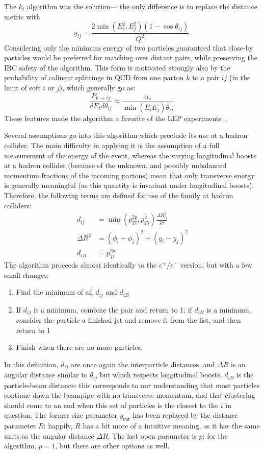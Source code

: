 The $k_t$ algorithm was the solution--- the only difference is to replace the distance metric with
%
\begin{equation}
y_{ij} = \frac{2 \min(E_i^2,E_j^2) (1-\cos{\theta_{ij}})}{Q^2}.
\end{equation}
%
Considering only the minimum energy of two particles guaranteed that close-by particles would be preferred for matching over distant pairs, while preserving the IRC safety of the algorithm. This form is motivated strongly also by the probability of colinear splittings in QCD from one parton $k$ to a pair $ij$ (in the limit of soft $i$ or $j$), which generally go as:
%
\begin{equation}
\frac{P_{k\rightarrow ij}}{dE_i d\theta_{ij}} \approx \frac{\alpha_s}{\min(E_i E_j) \theta_{ij}}.
\end{equation}
%
These features made the \kt algorithm a favorite of the LEP experiments~\cite{Jetography}.

Several assumptions go into this algorithm which preclude its use at a hadron collider. The main difficulty in applying it is the assumption of a full measurement of the energy of the event, whereas the varying longitudinal boosts at a hadron collider (because of the unknown, and possibly unbalanced momentum fractions of the incoming partons) mean that only transverse energy is generally meaningful (as this quantity is invariant under longitudinal boosts). Therefore, the following terms are defined for use of the \kt family at hadron colliders:
%
\begin{align}
d_{ij} &= \min(p_{Ti}^{2p}, p_{Tj}^{2}) \frac{\Delta R_{ij}^2}{R^2} \nonumber\\
\Delta R^2 &= (\phi_i - \phi_j)^2 + (y_i - y_j)^2\nonumber\\
d_{iB} &= p_{Ti}^{2p}
\end{align}
%
The algorithm proceeds almost identically to the $e^+/e^-$ version, but with a few small changes:
%
\begin{enumerate}
\item Find the minimum of all $d_{ij}$ and $d_{iB}$
\item If $d_{ij}$ is a minimum, combine the pair and return to 1; if $d_{iB}$ is a minimum, consider the particle a finished jet and remove it from the list, and then return to 1
\item Finish when there are no more particles.
\end{enumerate}
%
In this definition, $d_{ij}$ are once again the interparticle distances, and $\Delta R$ is an angular distance similar to $\theta_{ij}$ but which respects longitudinal boosts. $d_{iB}$ is the particle-beam distance: this corresponds to our understanding that most particles continue down the beampipe with no transverse momentum, and that clustering should come to an end when this set of particles is the closest to the $i$ in question. The former size parameter $y_\mathrm{cut}$ has been replaced by the distance parameter $R$: happily, $R$ has a bit more of a intuitive meaning, as it has the same units as the angular distance $\Delta R$. The last open parameter is $p$: for the \kt algorithm, $p=1$, but there are other options as well.


